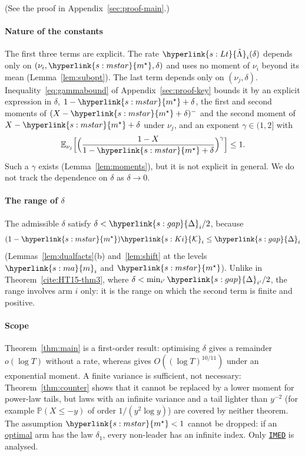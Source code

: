 \documentclass[11pt]{article}
\newcommand{\E}{\mathbb{E}}
\newcommand{\Prob}{\mathbb{P}}
\newcommand{\sy}[2]{{\hyperlink{#1}{#2}}}
\newcommand{\term}[2]{\hyperlink{#1}{#2}}
\newcommand{\imed}{\hyperref[alg:imed]{\texttt{IMED}}}
\newcommand{\marm}{\sy{s:ma}{m}}
\newcommand{\ms}{\sy{s:mstar}{m^{\star}}}
\newcommand{\gap}{\sy{s:gap}{\Delta}}
\newcommand{\Lt}{\sy{s:Lt}{\tilde{\Lambda}}}
\newcommand{\Ki}{\sy{s:Ki}{\mathcal{K}}}
\begin{document}
(See the proof in Appendix~\ref{sec:proof-main}.)

\paragraph{Nature of the constants} The first three terms are explicit. The rate $\Lt_i(\delta)$
depends only on $(\nu_i,\ms,\delta)$ and uses no moment of $\nu_i$ beyond its mean
(Lemma~\ref{lem:subopt}). The last term depends only on $(\nu_j,\delta)$. Inequality~\eqref{eq:gammabound}
of Appendix~\ref{sec:proof-key} bounds it by an explicit expression in $\delta$, $1-\ms+\delta$, the
first and second moments of $(X-\ms+\delta)^-$ and the second moment of $X-\ms+\delta$ under
$\nu_j$, and an exponent $\gamma\in(1,2]$ with
\begin{equation*}
  \E_{\nu_j}\Big[\Big(\frac{1-X}{1-\ms+\delta}\Big)^\gamma\Big]\le1.
\end{equation*}
Such a $\gamma$ exists (Lemma~\ref{lem:moments}), but it is not explicit in general. We do not track
the dependence on $\delta$ as $\delta\to0$.

\paragraph{The range of $\delta$} The admissible $\delta$ satisfy $\delta<\gap_i/2$, because
\begin{equation*}
  (1-\ms)\Ki_i\le\gap_i
\end{equation*}
(Lemmas~\ref{lem:dualfacts}(b) and~\ref{lem:shift} at the levels $\marm_i$ and $\ms$). Unlike in
Theorem~\ref{cite:HT15-thm3}, where $\delta<\min_{i'}\gap_{i'}/2$, the range involves arm $i$ only: it
is the range on which the second term is finite and positive.

\paragraph{Scope} Theorem~\ref{thm:main} is a first-order result: optimising $\delta$ gives a
remainder $o(\log T)$ without a rate, whereas \citet[Corollary~4]{HT15} gives $O((\log T)^{10/11})$
under an exponential moment. A finite variance is sufficient, not necessary: Theorem~\ref{thm:counter}
shows that it cannot be replaced by a lower moment for power-law tails, but laws with an infinite
variance and a tail lighter than $y^{-2}$ (for example $\Prob(X\le-y)$ of order $1/(y^2\log y)$) are
covered by neither theorem. The assumption $\ms<1$ cannot be dropped: if an \term{w:optimal}{optimal} arm has the law
$\delta_1$, every non-leader has an infinite index. Only \imed{} is analysed.
\end{document}
